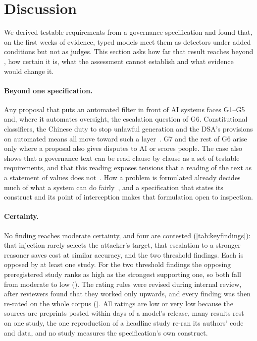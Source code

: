 \section{Discussion}
\label{sec:discussion}

We derived testable requirements from a governance specification and found that, on the first weeks of evidence, typed models meet them as detectors under added conditions but not as judges.
This section asks how far that result reaches beyond \pol{}, how certain it is, what the assessment cannot establish and what evidence would change it.

\paragraph{Beyond one specification.}
Any proposal that puts an automated filter in front of AI systems faces G1--G5 and, where it automates oversight, the escalation question of G6.
Constitutional classifiers, the Chinese duty to stop unlawful generation and the DSA's provisions on automated means all move toward such a layer~\cite{sharma2025constitutional,cac2023genai,dsa2022}.
G7 and the rest of G6 arise only where a proposal also gives disputes to AI or scores people.
The case also shows that a governance text can be read clause by clause as a set of testable requirements, and that this reading exposes tensions that a reading of the text as a statement of values does not~\cite{whittlestone2019role}.
How a problem is formulated already decides much of what a system can do fairly~\cite{passi2019problem}, and a specification that states its construct and its point of interception makes that formulation open to inspection.

\paragraph{Certainty.}
No finding reaches moderate certainty, and four are contested (\cref{tab:keyfindings}): that injection rarely selects the attacker's target, that escalation to a stronger reasoner saves cost at similar accuracy, and the two threshold findings.
Each is opposed by at least one study.
For the two threshold findings the opposing preregistered study ranks as high as the strongest supporting one, so both fall from moderate to low ().
The rating rules were revised during internal review, after reviewers found that they worked only upwards, and every finding was then re-rated on the whole corpus ().
All ratings are low or very low because the sources are preprints posted within days of a model's release, many results rest on one study, the one reproduction of a headline study re-ran its authors' code and data, and no study measures the specification's own construct.

